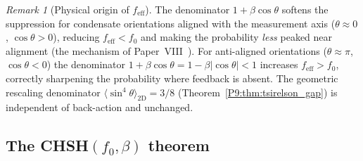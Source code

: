 \documentclass[11pt,a4paper]{article}
\theoremstyle{definition}
\theoremstyle{remark}
\newtheorem{remark}[theorem]{Remark}
\begin{document}
\begin{remark}[Physical origin of $f_\mathrm{eff}$]
\label{P9:rem:feff_physical_origin}
The denominator $1+\beta\cos\theta$ softens the suppression for
condensate orientations aligned with the measurement axis
($\theta\approx0$, $\cos\theta>0$), reducing $f_\mathrm{eff}<f_0$
and making the probability \emph{less} peaked near alignment
(the mechanism of Paper~VIII~\cite{Paper8}).
For anti-aligned orientations ($\theta\approx\pi$, $\cos\theta<0$)
the denominator $1+\beta\cos\theta = 1-\beta|\cos\theta| < 1$
increases $f_\mathrm{eff}>f_0$,
correctly sharpening the probability where feedback is absent.
The geometric rescaling denominator
$\langle\sin^4\theta\rangle_{2\mathrm{D}}=3/8$
(Theorem~\ref{P9:thm:tsirelson_gap}) is independent of back-action and unchanged.
\end{remark}
 
\subsection{The CHSH$(f_0,\beta)$ theorem}
 
\end{document}
